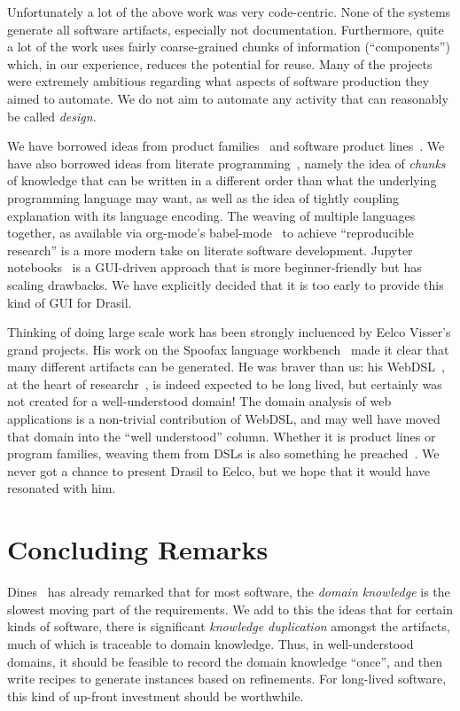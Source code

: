 \documentclass[a4paper,UKenglish,cleveref,autoref,thm-restate]{oasics-v2021}
\begin{document}
Unfortunately a lot of the above work was very code-centric. None of
the systems generate all software artifacts, especially not documentation.
Furthermore, quite a lot of the work uses fairly coarse-grained
chunks of information (``components'') which, in our experience, reduces the
potential for reuse. Many of the projects were extremely ambitious regarding
what aspects of software production they aimed to automate. We do not
aim to automate any activity that can reasonably be called \emph{design}.

We have borrowed ideas from product families~\cite{parnas1976families}
and software product lines~\cite{apel2016feature}.  We have also
borrowed ideas from literate programming~\cite{Knuth1984}, namely the
idea of \emph{chunks} of knowledge that can be written in a different
order than what the underlying programming language may want, as well as
the idea of tightly coupling explanation with its language encoding.
The weaving of multiple languages together, as available via
org-mode's babel-mode~\cite{schulte2012multi} to achieve ``reproducible
research'' is a more modern take on literate software development.
Jupyter notebooks~\cite{kluyver2016jupyter} is a GUI-driven approach
that is more beginner-friendly but has scaling drawbacks. We have
explicitly decided that it is too early to provide this kind of GUI
for Drasil.

Thinking of doing large scale work has been strongly incluenced by Eelco
Visser's grand projects. His work on the Spoofax language workbench~\cite{Spoofax}
made it clear that many different artifacts can be generated. He was braver than
us: his WebDSL~\cite{WebDSL}, at the heart of researchr~\cite{researchr}, is
indeed expected to be long lived, but certainly was not created for a
well-understood domain! The domain analysis of web applications is a non-trivial
contribution of WebDSL, and may well have moved that domain into the ``well understood''
column. Whether it is product lines or program families, weaving
them from DSLs is also something he preached~\cite{voelter2011product}.
We never got a chance to present Drasil to Eelco, but we hope that it would
have resonated with him.

\section{Concluding Remarks}
\label{sec:concluding-remarks}

Dines~\cite{bjorner2021domaineng} has already remarked that for most software,
the \emph{domain knowledge} is the slowest moving part of the requirements.
We add to this the ideas that for certain kinds of software, there is significant
\emph{knowledge duplication} amongst the artifacts, much of which is traceable
to domain knowledge. Thus, in well-understood domains, it should be feasible to
record the domain knowledge ``once'', and then write recipes to generate
instances based on refinements. For long-lived software, this kind of up-front
investment should be worthwhile.
\end{document}
